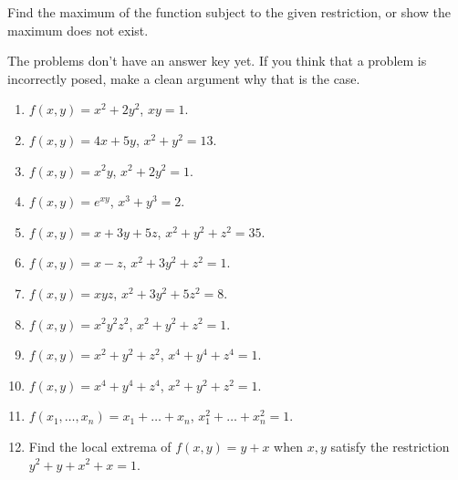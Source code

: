 Find the maximum of the function subject to the given restriction, or show the maximum does not exist. 

The problems don't have an answer key yet. If you think that a problem is incorrectly posed, make a clean argument why that is the case. 
\begin{enumerate}[ref={\fcProblemRef}]
\item $f(x,y)=x^2+2 y^2$, $x y=1$.
\item $f(x,y)=4x+5y$, $x^2+y^2=13$.
\item $f(x,y)=x^2y$, $x^2+2y^2 =1$.
\item $f(x,y)=e^{x y}$, $x^3+y^3 =2$.
\item $f(x,y)=x+3y+5z$, $x^2+y^2+z^2 =35$.
\item $f(x,y)=x-z$, $x^2+3y^2+z^2 =1$.
\item $f(x,y)=xyz$, $x^2+3y^2+5z^2 =8$.
\item $f(x,y)=x^2y^2z^2$, $ x^2+y^2+z^2=1$.
\item $f(x,y)=x^2+y^2+z^2 $, $x^4+y^4+z^4 =1$.
\item $f(x,y)=x^4+y^4+z^4$, $x^2+y^2+z^2 =1$.
\item $f(x_1,\dots, x_n) = x_1+\dots +x_n$, $x_1^2+\dots +x_n^2 =1$.

\item \label{problemFindExtremay+xUnderRestrictiony^2+y+x^2+x=1} Find the local extrema of $f(x,y)=y+x$ when $x,y$ satisfy the restriction $y^2+y+x^2+x=1$.

\end{enumerate}